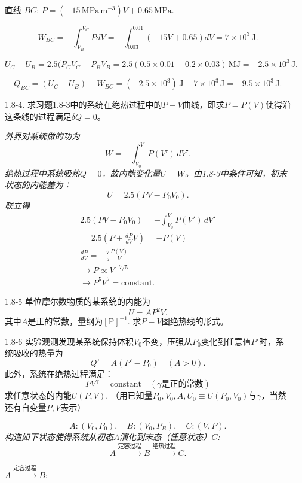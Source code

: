 \begin{enumerate}
{			直线 $BC$: $P = (-15\, \mathrm{MPa \, m^{-3}}) V + 0.65\, \mathrm{MPa}$.

			\[ W_{BC} = -\int_{V_B}^{V_C} PdV = -\int_{0.03}^{0.01} (-15V + 0.65) dV = 7 \times 10^3 \,\mathrm{J}. \]

			\[ U_C - U_B = 2.5(P_C V_C - P_B V_B = 2.5(0.5\times 0.01 - 0.2 \times 0.03) \,\mathrm{MJ} = -2.5 \times 10^3 \,\mathrm{J}. \]

			\[ Q_{BC} = (U_C - U_B) - W_{BC} = (-2.5 \times 10^3) \,\mathrm{J} - 7 \times 10^{3} \,\mathrm{J} = -9.5 \times 10^3 \,\mathrm{J}. \]
		}

	\item[1.8-4.]
		求习题1.8-3中的系统在绝热过程中的$P-V$曲线，即求$P = P(V)$使得沿这条线的过程满足$\delta Q = 0$。

		{\it
			外界对系统做的功为
				\[ W = -\int_{V_0}^{V} P(V') \, dV'. \]
			绝热过程中系统吸热$Q = 0$，故内能变化量$U = W$。由1.8-3中条件可知，初末状态的内能差为：
				\[ U = 2.5(P V - P_0 V_0). \]
			联立得
				\begin{align*}
					2.5 (PV - P_0 V_0) = -\int_{V_0}^V P(V') \, dV' \\
					= 2.5 \left(P + \frac{dP}{dV} V \right) = -P(V) \\
					\frac{dP}{dV} = -\frac{7}{5} \frac{P(V)}{V} \\
					\to P \propto V^{-7/5} \\
					\to P^5 V^7 = \mathrm{constant}.
				\end{align*}
		}
	\item[1.8-5]
		单位摩尔数物质的某系统的内能为
		\[ U = AP^2 V. \]
		其中$A$是正的常数，量纲为$[\mathrm{P}]^{-1}$. 求$P-V$图绝热线的形式。

	\item[1.8-6]
		实验观测发现某系统保持体积$V_0$不变，压强从$P_0$变化到任意值$P'$时，系统吸收的热量为
		\[ Q' = A(P' - P_0) \quad(A > 0). \]
		此外，系统在绝热过程满足：
		\[ P V^\gamma = \text{constant} \quad (\gamma\text{是正的常数}) \]
		求任意状态的内能$U(P, V)$. （用已知量$P_0, V_0, A, U_0 \equiv U(P_0, V_0)\text{与} \gamma$，当然还有自变量$P, V$表示）

		{\it
			\[ A: (V_0, P_0), \quad B: (V_0, P_B), \quad C: (V, P). \]
			构造如下状态使得系统从初态$A$演化到末态（任意状态）$C$:
			\[ A \stackrel{\text{定容过程}}{\longrightarrow} B \stackrel{\text{绝热过程}}{\longrightarrow} C. \]

			$A \stackrel{\text{定容过程}}{\longrightarrow} B$: 
				
}
\end{enumerate}
